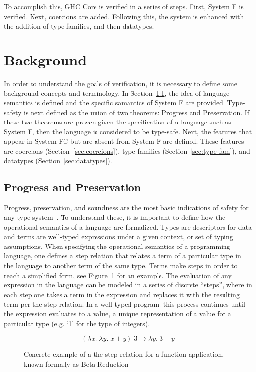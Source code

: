 \documentclass{sig-alternate}
\begin{document}
To accomplish this, GHC Core is verified in a series of steps. First, System F is verified. Next, coercions are added. Following this, the system is enhanced with the addition of type families, and then datatypes.

\section{Background}
\label{sec:background}
In order to understand the goals of verification, it is necessary to define some background concepts and terminology. In Section~\ref{sec:prog-pres}, the idea of language semantics is defined and the specific samantics of System F are provided.  Type-safety is next defined as the union of two theorems: Progress and Preservation. If these two theorems are proven given the specification of a language such as System F, then the language is considered to be type-safe. Next, the features that appear in System FC but are absent from System F are defined. These features are coercions (Section~\ref{sec:coercions}), type families (Section~\ref{sec:type-fam}), and datatypes (Section~\ref{sec:datatypes}).
\subsection{Progress and Preservation}
\label{sec:prog-pres}
Progress, preservation, and soundness are the most basic indications of safety for any type system~\cite{Pierce:TAPL}. To understand these, it is important to define how the operational semantics of a language are formalized. Types are descriptors for data and terms are well-typed expressions under a given context, or set of typing assumptions. When specifying the operational semantics of a programming language, one defines a step relation that relates a term of a particular type in the language to another term of the same type. Terms make steps in order to reach a simplified form, see Figure~\ref{fig:step-ex} for an example. The evaluation of any expression in the language can be modeled in a series of discrete ``steps'', where in each step one takes a term in the expression and replaces it with the resulting term per the step relation. In a well-typed program, this process continues until the expression evaluates to a value, a unique representation of a value for a particular type (e.g. `1' for the type of integers).

\begin{figure}[h!]
  $$(\lambda x .\; \lambda y .\;x+y)\; 3 \rightarrow \lambda y.\;3+y$$
  \caption{Concrete example of a the step relation for a function application, known formally as Beta Reduction}
  \label{fig:step-ex}
\end{figure}
\end{document}
